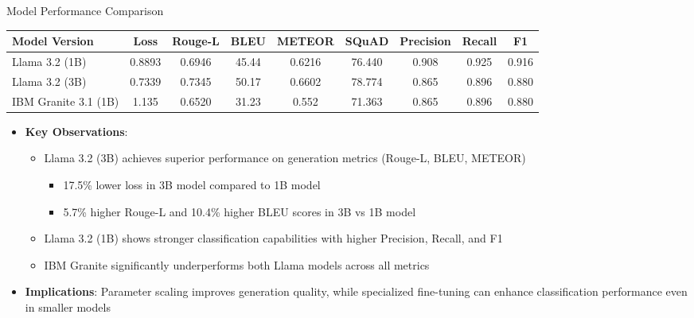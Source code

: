 \begin{frame}{Model Performance Comparison}
      \scriptsize
      \begin{table}
        \centering
        \begin{tabular}{|l|c|c|c|c|c|c|c|c|}
          \hline
          \textbf{Model Version} & \textbf{Loss} & \textbf{Rouge-L} & \textbf{BLEU} & \textbf{METEOR} & \textbf{SQuAD} & \textbf{Precision} & \textbf{Recall} & \textbf{F1} \\
          \hline
          Llama 3.2 (1B) & 0.8893 & 0.6946 & 45.44 & 0.6216 & 76.440 & 0.908 & 0.925 & 0.916 \\
          Llama 3.2 (3B) & 0.7339 & 0.7345 & 50.17 & 0.6602 & 78.774 &0.865 & 0.896 & 0.880 \\
          IBM Granite 3.1 (1B) & 1.135 & 0.6520 & 31.23 & 0.552 & 71.363 &0.865 & 0.896 & 0.880 \\
          \hline
        \end{tabular}
      \end{table}    
      \vspace{0.2cm}
      \footnotesize
      \begin{itemize}
        \item \textbf{Key Observations}:
          \footnotesize
          \begin{itemize}
            \item Llama 3.2 (3B) achieves superior performance on generation metrics (Rouge-L, BLEU, METEOR)
            \begin{itemize}
                \item 17.5\% lower loss in 3B model compared to 1B model
                \item 5.7\% higher Rouge-L and 10.4\% higher BLEU scores in 3B vs 1B model
            \end{itemize}
            \item Llama 3.2 (1B) shows stronger classification capabilities with higher Precision, Recall, and F1
            \item IBM Granite significantly underperforms both Llama models across all metrics
          \end{itemize}
        \item \textbf{Implications}: Parameter scaling improves generation quality, while specialized fine-tuning can enhance classification performance even in smaller models
      \end{itemize}
\end{frame}

